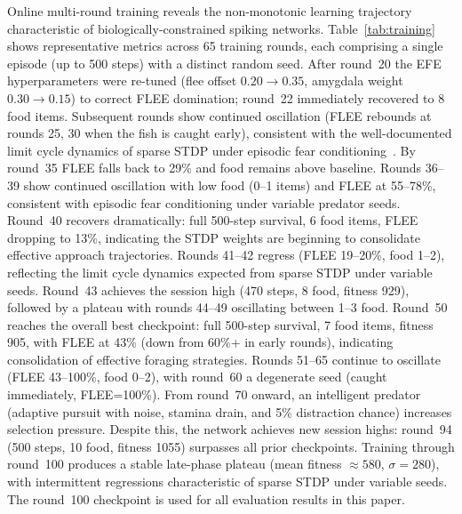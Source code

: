 \documentclass[12pt]{article}
\begin{document}
Online multi-round training reveals the non-monotonic learning trajectory
characteristic of biologically-constrained spiking networks.
Table~\ref{tab:training} shows representative metrics across 65 training
rounds, each comprising a single episode (up to 500 steps) with
a distinct random seed.
After round~20 the EFE hyperparameters were re-tuned (flee offset $0.20\to0.35$,
amygdala weight $0.30\to0.15$) to correct FLEE domination; round~22
immediately recovered to 8 food items.
Subsequent rounds show continued oscillation (FLEE rebounds at rounds 25, 30
when the fish is caught early), consistent with the well-documented limit cycle
dynamics of sparse STDP under episodic fear conditioning~\cite{bi1998}.
By round~35 FLEE falls back to 29\% and food remains above baseline.
Rounds 36--39 show continued oscillation with low food (0--1 items)
and FLEE at 55--78\%, consistent with episodic fear conditioning under
variable predator seeds.
Round~40 recovers dramatically: full 500-step survival, 6 food items,
FLEE dropping to 13\%, indicating the STDP weights are beginning to
consolidate effective approach trajectories.
Rounds 41--42 regress (FLEE 19--20\%, food 1--2), reflecting the limit
cycle dynamics expected from sparse STDP under variable seeds.
Round~43 achieves the session high (470 steps, 8 food, fitness 929),
followed by a plateau with rounds 44--49 oscillating between 1--3 food.
Round~50 reaches the overall best checkpoint: full 500-step survival,
7 food items, fitness 905, with FLEE at 43\% (down from 60\%+ in early
rounds), indicating consolidation of effective foraging strategies.
Rounds 51--65 continue to oscillate (FLEE 43--100\%, food 0--2),
with round~60 a degenerate seed (caught immediately, FLEE=100\%).
From round~70 onward, an intelligent predator (adaptive pursuit with
noise, stamina drain, and 5\% distraction chance) increases selection
pressure.
Despite this, the network achieves new session highs: round~94
(500 steps, 10 food, fitness 1055) surpasses all prior checkpoints.
Training through round~100 produces a stable late-phase plateau
(mean fitness $\approx 580$, $\sigma = 280$), with intermittent
regressions characteristic of sparse STDP under variable seeds.
The round~100 checkpoint is used for all evaluation results in this paper.
\end{document}

